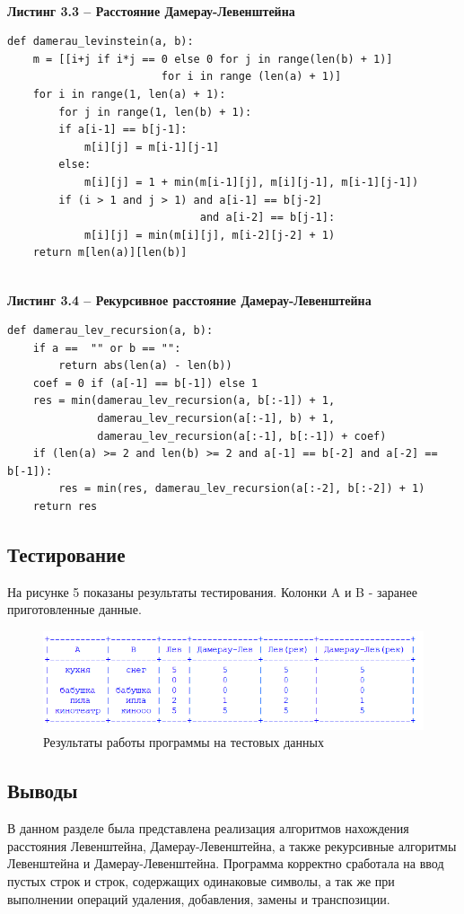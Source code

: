 \documentclass[a4paper,12pt]{article}
\begin{document}
 \textbf{\\Листинг 3.3 -- Расстояние Дамерау-Левенштейна }

\begin{lstlisting}
def damerau_levinstein(a, b):
	m = [[i+j if i*j == 0 else 0 for j in range(len(b) + 1)] 
						for i in range (len(a) + 1)]
	for i in range(1, len(a) + 1):
		for j in range(1, len(b) + 1):
		if a[i-1] == b[j-1]:
			m[i][j] = m[i-1][j-1]
		else:
			m[i][j] = 1 + min(m[i-1][j], m[i][j-1], m[i-1][j-1])
		if (i > 1 and j > 1) and a[i-1] == b[j-2] 
		                      and a[i-2] == b[j-1]:
			m[i][j] = min(m[i][j], m[i-2][j-2] + 1)
	return m[len(a)][len(b)]
\end{lstlisting}

 \textbf{\\Листинг 3.4 -- Рекурсивное расстояние Дамерау-Левенштейна }

\begin{lstlisting}
def damerau_lev_recursion(a, b):
	if a ==  "" or b == "":
		return abs(len(a) - len(b))
	coef = 0 if (a[-1] == b[-1]) else 1
	res = min(damerau_lev_recursion(a, b[:-1]) + 1,
			  damerau_lev_recursion(a[:-1], b) + 1,
			  damerau_lev_recursion(a[:-1], b[:-1]) + coef)
	if (len(a) >= 2 and len(b) >= 2 and a[-1] == b[-2] and a[-2] == b[-1]):
		res = min(res, damerau_lev_recursion(a[:-2], b[:-2]) + 1)
	return res
\end{lstlisting}

\subsection{Тестирование}
\hfill

На рисунке 5 показаны результаты тестирования. Колонки A и B - заранее приготовленные данные.
\begin{figure}[H]
	\centering
	\includegraphics[scale=0.6]{test.png} 
	\captionsetup{justification=centering}
	\caption{Результаты работы программы на тестовых данных}
	\label{пример1}
\end{figure}

\subsection{Выводы}
В данном разделе была представлена реализация алгоритмов нахождения расстояния Левенштейна, Дамерау-Левенштейна, а также рекурсивные алгоритмы Левенштейна и Дамерау-Левенштейна. Программа корректно сработала на ввод пустых строк и строк, содержащих одинаковые символы, а так же при выполнении операций удаления, добавления, замены и транспозиции.
\newpage
\end{document}
